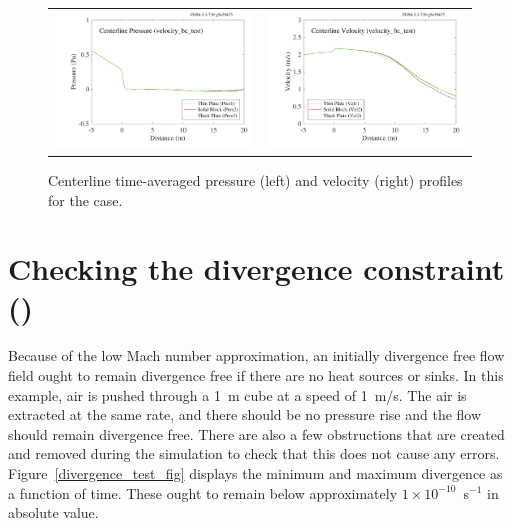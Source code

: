 \documentclass[11pt]{book}
\begin{document}
\begin{figure}[!ht]
\begin{tabular*}{\textwidth}{lr}
\includegraphics[width=3.2in]{SCRIPT_FIGURES/velocity_bc_test_pres} &
\includegraphics[width=3.2in]{SCRIPT_FIGURES/velocity_bc_test_vel}
\end{tabular*}
\caption[The  test case]{Centerline time-averaged pressure (left) and velocity (right) profiles for the  case.}
\label{velocity_bc_test_plot}
\end{figure}


\section{Checking the divergence constraint (\texorpdfstring{}{divergence\_test})}
\label{divergence_test}

Because of the low Mach number approximation, an initially divergence free flow field ought to remain divergence free if there are no heat sources or sinks. In this example, air is pushed through a 1~m cube at a speed of 1~m/s. The air is extracted at the same rate, and there should be no pressure rise and the flow should remain divergence free. There are also a few obstructions that are created and removed during the simulation to check that this does not cause any errors. Figure~\ref{divergence_test_fig} displays the minimum and maximum divergence as a function of time. These ought to remain below approximately $1 \times 10^{-10}$~s$^{-1}$ in absolute value.
\end{document}
